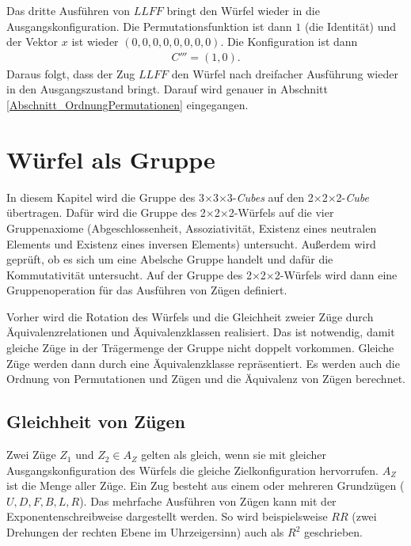 \documentclass[12pt,a4paper, usenames, dvipsnames]{article}
\theoremstyle{mystyle}
\theoremstyle{definition}
\newcommand{\Ttwo}{2$\times$2$\times$2-}
\newcommand{\Tthree}{3$\times$3$\times$3-}
\begin{document}
Das dritte Ausführen von $LLFF$ bringt den Würfel wieder in die Ausgangskonfiguration. Die Permutationsfunktion ist dann $1$ (die Identität) und der Vektor $x$ ist wieder $(0,0,0,0,0,0,0,0)$. Die Konfiguration ist dann
\begin{align*}
C''' = (1,0).
\end{align*}
Daraus folgt, dass der Zug $LLFF$ den Würfel nach dreifacher Ausführung wieder in den Ausgangszustand bringt. Darauf wird genauer in Abschnitt \ref{Abschnitt_OrdnungPermutationen} eingegangen.

%
%
%
%
%
%
%
%
%
%
%
%
%
%

\newpage
\section{Würfel als Gruppe}

\label{Kapitel_WürfelAlsGruppe}

In diesem Kapitel wird die Gruppe des \Tthree \textit{Cubes} auf den \Ttwo \textit{Cube} übertragen. Dafür wird die Gruppe des \Ttwo Würfels auf die vier Gruppenaxiome (Abgeschlossenheit, Assoziativität, Existenz eines neutralen Elements und Existenz eines inversen Elements) untersucht. Außerdem wird geprüft, ob es sich um eine Abelsche Gruppe handelt und dafür die Kommutativität untersucht. Auf der Gruppe des \Ttwo Würfels wird dann eine Gruppenoperation für das Ausführen von Zügen definiert.

Vorher wird die Rotation des Würfels und die Gleichheit zweier Züge durch Äquivalenz\-relationen und Äquivalenzklassen realisiert. Das ist notwendig, damit gleiche Züge in der Trägermenge der Gruppe nicht doppelt vorkommen. Gleiche Züge werden dann durch eine Äquivalenzklasse repräsentiert. Es werden auch die Ordnung von Permutationen und Zügen und die Äquivalenz von Zügen berechnet.

%
%
%
%
%
%
%
%
%
%
%
%
%
%
%
%
%
%
%

\subsection{Gleichheit von Zügen} 

Zwei Züge $Z_1$ und $Z_2 \in A_Z$ gelten als gleich, wenn sie mit gleicher Ausgangskonfiguration des Würfels die gleiche Zielkonfiguration hervorrufen. $A_Z$ ist die Menge aller Züge.
Ein Zug besteht aus einem oder mehreren Grundzügen ($U, D, F, B, L, R$).
Das mehrfache Ausführen von Zügen kann mit der Exponentenschreibweise dargestellt werden. So wird beispielsweise $RR$ (zwei Drehungen der rechten Ebene im Uhrzeigersinn) auch als $R^2$ geschrieben.
\end{document}
